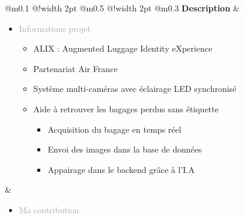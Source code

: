 \documentclass{article}
\begin{document}
\begin{tabular}
    {
        @{}m{}
        @{\hspace{0.001\textwidth}}!{\color{secondaryBlue}\vline width 2pt}
        @{}m{0.5\textwidth}
        @{\hspace{0.025\textwidth}}!{\color{secondaryBlue}\vline width 2pt}
        @{}m{0.3\textwidth}
    }
    \textcolor{secondaryBlue}{\textbf{Description}}           
    &
    \begin{itemize}[label={}, topsep=8pt, partopsep=0pt, itemsep=0.5pt, parsep=2pt, after=\vspace*{-\baselineskip}]
        \setlength{\itemsep}{10pt} 
        \item \textcolor{darkGray}{Informations projet}
        \begin{itemize}[label={\textcolor{gray!80}{\checkmark}}, topsep=8pt, partopsep=0pt, itemsep=0.5pt, parsep=2pt] 
            \item \textcolor{gray!80}{ALIX : Augmented Luggage Identity eXperience}
            \item \textcolor{gray!80}{Partenariat Air France}
            \item \textcolor{gray!80}{Système multi-caméras avec éclairage LED synchronisé}
            \item \textcolor{gray!80}{Aide à retrouver les bagages perdus sans étiquette}
            \begin{itemize}
                [label={\textcolor{gray!80}{$\triangleright$}}, topsep=0pt, partopsep=0pt, itemsep=0.5pt, parsep=2pt] 
                \item \textcolor{gray!80}{Acquisition du bagage en temps réel}
                \item \textcolor{gray!80}{Envoi des images dans la base de données}
                \item \textcolor{gray!80}{Appairage dans le backend grâce à l'I.A}
            \end{itemize}
        \end{itemize}
    \end{itemize}
    &
    \begin{itemize}[label={}, topsep=8pt, partopsep=0pt, itemsep=0.5pt, parsep=2pt, after=\vspace*{-\baselineskip}]
        \setlength{\itemsep}{10pt} 
        \item \textcolor{darkGray}{Ma contribution}
        \begin{itemize}[label={\textcolor{gray!80}{\checkmark}}, topsep=8pt, partopsep=0pt, itemsep=0.5pt, parsep=2pt] 

\end{itemize}
\end{itemize}
\end{tabular}
\end{document}
